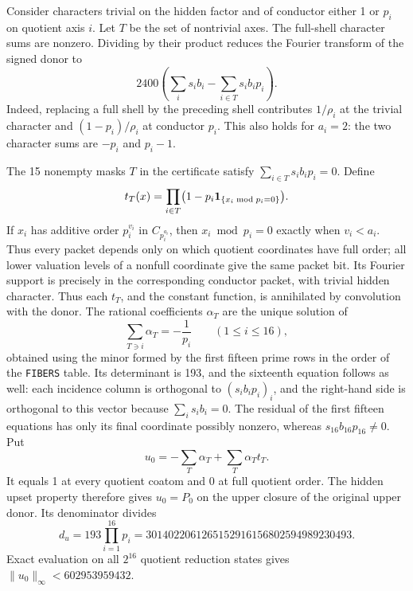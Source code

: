 Consider characters trivial on the hidden factor and of conductor either
1 or $p_i$ on quotient axis $i$.  Let $T$ be the set of nontrivial axes.
The full-shell character sums are nonzero.  Dividing by their product
reduces the Fourier transform of the signed donor to
\begin{equation}\label{h100:upper-transform}
 2400\left(\sum_i s_i b_i-\sum_{i\in T}s_i b_i p_i\right).
\end{equation}
Indeed, replacing a full shell by the preceding shell contributes
$1/\rho_i$ at the trivial character and $(1-p_i)/\rho_i$ at conductor
$p_i$.  This also holds for $a_i=2$: the two character sums are $-p_i$
and $p_i-1$.

The 15 nonempty masks $T$ in the certificate satisfy
$\sum_{i\in T}s_i b_i p_i=0$.  Define
\[
 t_T(x)=\prod_{i\in T}
   \bigl(1-p_i\mathbf1_{\{x_i\bmod p_i=0\}}\bigr).
\]
If $x_i$ has additive order $p_i^{v_i}$ in $C_{p_i^{a_i}}$, then
$x_i\bmod p_i=0$ exactly when $v_i<a_i$.  Thus every packet depends
only on which quotient coordinates have full order; all lower
valuation levels of a nonfull coordinate give the same packet bit.
Its Fourier support is precisely in the corresponding conductor packet,
with trivial hidden character.  Thus each $t_T$, and the constant
function, is annihilated by convolution with the donor.  The rational
coefficients $\alpha_T$ are the unique solution of
\[
 \sum_{T\ni i}\alpha_T=-\frac1{p_i}\qquad(1\le i\le16),
\]
obtained using the minor formed by the first fifteen prime rows in the
order of the \texttt{FIBERS} table.  Its determinant is 193, and the
sixteenth equation follows as well: each incidence column is orthogonal
to $(s_i b_i p_i)_i$, and the right-hand side is orthogonal to this
vector because $\sum_i s_i b_i=0$. The residual of the first fifteen
equations has only its final coordinate possibly nonzero, whereas
$s_{16}b_{16}p_{16}\ne0$.  Put
\begin{equation}\label{h100:upper-witness}
 u_0=-\sum_T\alpha_T+\sum_T\alpha_T t_T.
\end{equation}
It equals 1 at every quotient coatom and 0 at full quotient order.
The hidden upset property therefore gives $u_0=P_0$ on the upper
closure of the original upper donor.  Its denominator divides
\[
 d_u=193\prod_{i=1}^{16}p_i
 =3014022061265152916156802594989230493.
\]
Exact evaluation on all $2^{16}$ quotient reduction states gives
$\|u_0\|_\infty<602953959432$.

